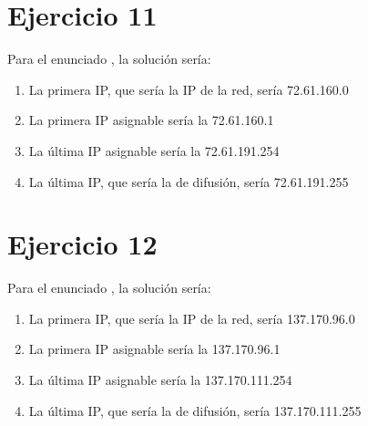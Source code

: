\documentclass[letterpaper,10pt,spanish]{sphinxmanual}
\begin{document}
\section{Ejercicio 11}
\label{\detokenize{t2_integracion_elementos/ejercicios_subredes_ipv4/rangos_direcciones:id11}}
\sphinxAtStartPar
Para el enunciado , la solución sería:
\begin{enumerate}
%
\item {} 
\sphinxAtStartPar
La primera IP, que sería la IP de la red, sería 72.61.160.0

\item {} 
\sphinxAtStartPar
La primera IP asignable sería la 72.61.160.1

\item {} 
\sphinxAtStartPar
La última IP asignable sería la 72.61.191.254

\item {} 
\sphinxAtStartPar
La última IP, que sería la de difusión, sería 72.61.191.255

\end{enumerate}


\section{Ejercicio 12}
\label{\detokenize{t2_integracion_elementos/ejercicios_subredes_ipv4/rangos_direcciones:id12}}
\sphinxAtStartPar
Para el enunciado , la solución sería:
\begin{enumerate}
%
\item {} 
\sphinxAtStartPar
La primera IP, que sería la IP de la red, sería 137.170.96.0

\item {} 
\sphinxAtStartPar
La primera IP asignable sería la 137.170.96.1

\item {} 
\sphinxAtStartPar
La última IP asignable sería la 137.170.111.254

\item {} 
\sphinxAtStartPar
La última IP, que sería la de difusión, sería 137.170.111.255

\end{enumerate}
\end{document}
